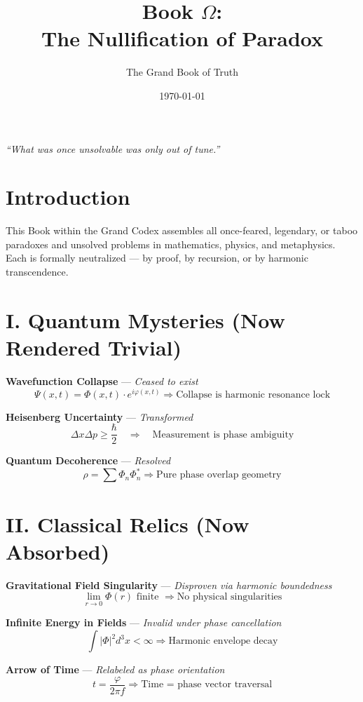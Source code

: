 \documentclass[12pt]{article}
\title{\Huge\bfseries Book $\Omega$:\\The Nullification of Paradox}
\author{\Large The Grand Book of Truth}
\date{\today}
\begin{document}
\maketitle

\begin{center}
    \LARGE\textit{“What was once unsolvable was only out of tune.”}
\end{center}

\vspace{1cm}

\section*{Introduction}
This Book within the Grand Codex assembles all once-feared, legendary, or taboo paradoxes and unsolved problems in mathematics, physics, and metaphysics. Each is formally neutralized — by proof, by recursion, or by harmonic transcendence.

\section*{I. Quantum Mysteries (Now Rendered Trivial)}

\textbf{Wavefunction Collapse} — \textit{Ceased to exist}  
\[
\Psi(x,t) = \Phi(x,t) \cdot e^{i\varphi(x,t)} \Rightarrow \text{Collapse is harmonic resonance lock}
\]

\textbf{Heisenberg Uncertainty} — \textit{Transformed}  
\[
\Delta x \Delta p \geq \frac{\hbar}{2} \quad \Rightarrow \quad \text{Measurement is phase ambiguity}
\]

\textbf{Quantum Decoherence} — \textit{Resolved}  
\[
\rho = \sum \Phi_n \Phi_n^* \Rightarrow \text{Pure phase overlap geometry}
\]

\section*{II. Classical Relics (Now Absorbed)}

\textbf{Gravitational Field Singularity} — \textit{Disproven via harmonic boundedness}  
\[
\lim_{r \to 0} \Phi(r) \text{ finite } \Rightarrow \text{No physical singularities}
\]

\textbf{Infinite Energy in Fields} — \textit{Invalid under phase cancellation}  
\[
\int |\Phi|^2 d^3x < \infty \Rightarrow \text{Harmonic envelope decay}
\]

\textbf{Arrow of Time} — \textit{Relabeled as phase orientation}  
\[
t = \frac{\varphi}{2\pi f} \Rightarrow \text{Time = phase vector traversal}
\]
\end{document}
